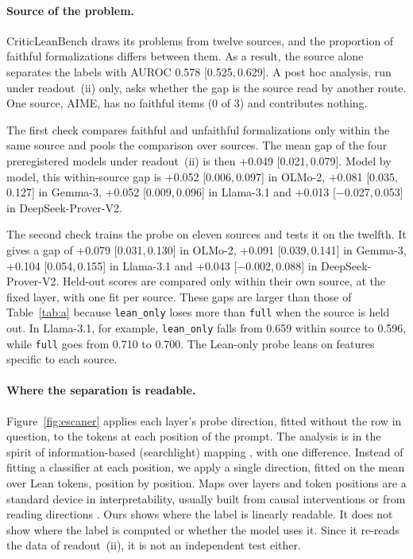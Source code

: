 \documentclass[10pt]{article}
\newcommand{\vr}[1]{\texttt{#1}}
\newcommand{\ic}[2]{[#1,\,#2]}
\begin{document}
\paragraph{Source of the problem.}
CriticLeanBench draws its problems from twelve sources, and the proportion of faithful formalizations differs
between them. As a result, the source alone separates the labels with AUROC 0.578 \ic{0.525}{0.629}. A post hoc
analysis, run under readout~(ii) only, asks whether the gap is the source read by another route. One source, AIME,
has no faithful items (0 of 3) and contributes nothing.

The first check compares faithful and unfaithful formalizations only within the same source and pools the
comparison over sources. The mean gap of the four preregistered models under readout~(ii) is then +0.049
\ic{0.021}{0.079}. Model by model, this within-source gap is +0.052 \ic{0.006}{0.097} in OLMo-2, +0.081
\ic{0.035}{0.127} in Gemma-3, +0.052 \ic{0.009}{0.096} in Llama-3.1 and +0.013 \ic{−0.027}{0.053} in
DeepSeek-Prover-V2.

The second check trains the probe on eleven sources and tests it on the twelfth. It gives a gap of +0.079
\ic{0.031}{0.130} in OLMo-2, +0.091 \ic{0.039}{0.141} in Gemma-3, +0.104 \ic{0.054}{0.155} in Llama-3.1 and +0.043
\ic{−0.002}{0.088} in DeepSeek-Prover-V2. Held-out scores are compared only within their own source, at the fixed
layer, with one fit per source. These gaps are larger than those of Table~\ref{tab:a} because \vr{lean\_only} loses
more than \vr{full} when the source is held out. In Llama-3.1, for example, \vr{lean\_only} falls from 0.659 within
source to 0.596, while \vr{full} goes from 0.710 to 0.700. The Lean-only probe leans on features specific to each
source.

\paragraph{Where the separation is readable.}
Figure~\ref{fig:escaner} applies each layer's probe direction, fitted without the row in question, to the tokens at
each position of the prompt. The analysis is in the spirit of information-based (searchlight) mapping
\citep{searchlight}, with one difference. Instead of fitting a classifier at each position, we apply a single
direction, fitted on the mean over Lean tokens, position by position. Maps over layers and token positions are a
standard device in interpretability, usually built from causal interventions \citep{meng2022rome,geometry} or from
reading directions \citep{zou2023repe}. Ours shows where the label is linearly readable. It does not show where the
label is computed or whether the model uses it. Since it re-reads the data of readout~(ii), it is not an
independent test either.
\end{document}
